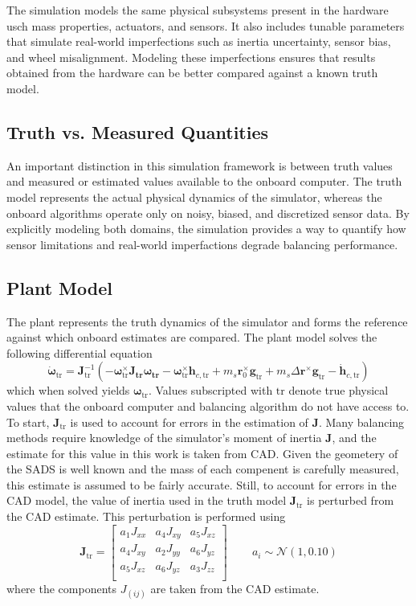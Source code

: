 The simulation models the same physical subsystems present in the hardware usch mass properties, actuators, and sensors. It also includes tunable parameters that simulate real-world imperfections such as inertia uncertainty, sensor bias, and wheel misalignment. Modeling these imperfections ensures that results obtained from the hardware can be better compared against a known truth model.

\subsection{Truth vs. Measured Quantities}

An important distinction in this simulation framework is between truth values and measured or estimated values available to the onboard computer. The truth model represents the actual physical dynamics of the simulator, whereas the onboard algorithms operate only on noisy, biased, and discretized sensor data. By explicitly modeling both domains, the simulation provides a way to quantify how sensor limitations and real-world imperfactions degrade balancing performance.

\subsection{Plant Model}
The plant represents the truth dynamics of the simulator and forms the reference against which onboard estimates are compared. The plant model solves the following differential equation
\begin{equation}
    \dot{\bm{\omega}}_\text{tr} = \bm{J}_\text{tr}^{-1}(-\bm{\omega}_\text{tr}^\times \bm{J_\text{tr}\omega_\text{tr}} 
    - \bm{\omega}_\text{tr}^\times\bm{h}_{c,\text{tr}} + m_s\bm{r}_0^{\times}\bm{g}_\text{tr} + m_s\Delta\bm{r}^{\times}\bm{g}_\text{tr}
    - \dot{\bm{h}}_{c,\text{tr}})
\end{equation}
which when solved yields $\bm{\omega}_\text{tr}$. Values subscripted with $\text{tr}$ denote true physical values that the onboard computer and balancing algorithm do not have access to. To start, $\bm{J}_\text{tr}$ is used to account for errors in the estimation of $\bm{J}$. Many balancing methods require knowledge of the simulator's moment of inertia $\bm{J}$, and the estimate for this value in this work is taken from CAD. Given the geometery of the SADS is well known and the mass of each compenent is carefully measured, this estimate is assumed to be fairly accurate. Still, to account for errors in the CAD model, the value of inertia used in the truth model $\bm{J}_\text{tr}$ is perturbed from the CAD estimate. This perturbation is performed using
\begin{equation}
    \bm{J}_\text{tr} = \begin{bmatrix}
        a_1J_{xx} & a_4J_{xy} & a_5J_{xz} \\
        a_4J_{xy} & a_2J_{yy} & a_6J_{yz} \\
        a_5J_{xz} & a_6J_{yz} & a_3J_{zz} \\
    \end{bmatrix}\qquad\,a_i\sim\mathcal{N}(1,0.10)
\end{equation}
where the components $J_{(ij)}$ are taken from the CAD estimate.

